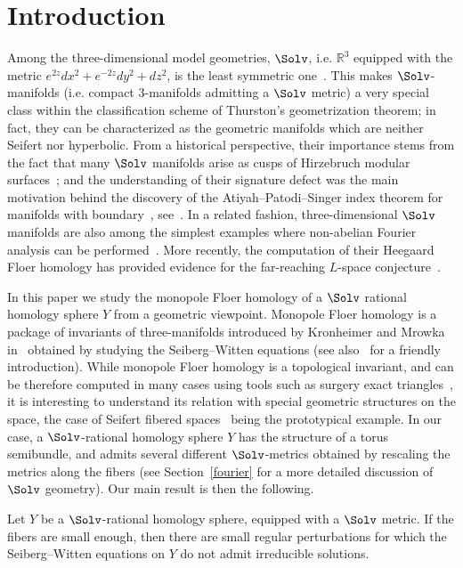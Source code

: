 \section{Introduction}
Among the three-dimensional model geometries, $\Solv$, i.e. $\mathbb{R}^3$ equipped with the metric $e^{2z}dx^2+e^{-2z}dy^2+dz^2$, is the least symmetric one~\cite{Sco}. This makes $\Solv$-manifolds (i.e. compact $3$-manifolds admitting a $\Solv$ metric) a very special class within the classification scheme of Thurston's geometrization theorem; in fact, they can be characterized as the geometric manifolds which are neither Seifert nor hyperbolic. From a historical perspective, their importance stems from the fact that many $\Solv$ manifolds arise as cusps of Hirzebruch modular surfaces~\cite{Hir}; and the understanding of their signature defect was the main motivation behind the discovery of the Atiyah--Patodi--Singer index theorem for manifolds with boundary~\cite{APS}, see~\cite{ADS}. In a related fashion, three-dimensional $\Solv$ manifolds are also among the simplest examples where non-abelian Fourier analysis can be performed~\cite{Bre}. More recently, the computation of their Heegaard Floer homology has provided evidence for the far-reaching $L$-space conjecture~\cite{BCW}.


In this paper we study the monopole Floer homology of a $\Solv$ rational homology sphere $Y$ from a geometric viewpoint. Monopole Floer homology is a package of invariants of three-manifolds introduced by Kronheimer and Mrowka in~\cite{KM} obtained by studying the Seiberg--Witten equations (see also~\cite{Lin3} for a friendly introduction). While monopole Floer homology is a topological invariant, and can be therefore computed in many cases using tools such as surgery exact triangles~\cite{KMOS}, it is interesting to understand its relation with special geometric structures on the space, the case of Seifert fibered spaces~\cite{MOY} being the prototypical example. In our case, a $\Solv$-rational homology sphere $Y$ has the structure of a torus semibundle, and admits several different $\Solv$-metrics obtained by rescaling the metrics along the fibers (see Section~\ref{fourier} for a more detailed discussion of $\Solv$ geometry). Our main result is then the following.
\begin{theo}\label{main}
Let $Y$ be a $\Solv$-rational homology sphere, equipped with a $\Solv$ metric. If the fibers are small enough, then there are small regular perturbations for which the Seiberg--Witten equations on $Y$ do not admit irreducible solutions.
\end{theo}

